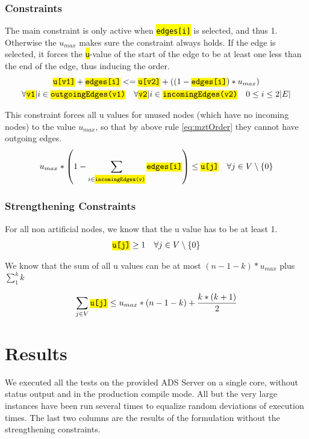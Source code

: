 \documentclass[,%
			paper=a4,%
			DIV14,
			liststotoc,
			bibtotoc,
			draft=false,%
			numbers=noendperiod
			]{scrartcl}
\newcommand{\ilc}[1]{\hl{\texttt{#1}}} %
\newcommand{\vertex}{j}
\newcommand{\edge}{i}
\newcommand{\forallEdges}{\ensuremath{0 \leq \edge \leq 2|E|}}
\begin{document}
\subsubsection{Constraints}
The main constraint is only active when \ilc{edges[\edge]} is selected, and thus 1. Otherwise the $u_{max}$ makes sure the constraint always holds. If the edge is selected, it forces the \ilc{u}-value of the start of the edge to be at least one less than the end of the edge, thus inducing the order.
	\begin{gather}
	\ilc{u[v1]} + \ilc{edges[\edge]} <= \ilc{u[v2]} + ( ( 1 - \ilc{edges[\edge]}) * u_{max} ) \nonumber \\
	\forall \ilc{v1}| \edge \in \ilc{outgoingEdges(v1)}
	\quad
	\forall \ilc{v2} | \edge \in \ilc{incomingEdges(v2)}
	\quad \forallEdges
\label{eq:mztOrder}
\end{gather}

This constraint forces all u values for unused nodes (which have no incoming nodes) to the value $u_{max}$, so that by above rule \eqref{eq:mztOrder} they cannot have outgoing edges.
\begin{equation}\label{eq:mztUnused}
 u_{max}*\left(1 - \sum_{ i \in \ilc{incomingEdges(v)}} \ilc{edges[i]} \right) \leq \ilc{u[\vertex]}
 \quad \forall \vertex \in V  \setminus \{0\}
\end{equation}


\subsubsection{Strengthening Constraints}
For all non artificial nodes, we know that the u value has to be at least 1.
\begin{equation}\label{eq:mztNodes1}
 \ilc{u[\vertex]} \geq 1
 \quad \forall \vertex \in V  \setminus \{0\}
\end{equation}

We know that the sum of all u values can be at most $(n-1 - k) * u_{max}$ plus $\sum_1^k{k}$

\begin{equation}\label{eq:mztMaxU}
	\sum_{\vertex \in V}{\ilc{u[\vertex]}} \leq u_{max} * ( n - 1 - k ) + \frac{k * (k+1)}{2}
\end{equation}


\section{Results}
We executed all the tests on the provided ADS Server on a single core, without status output and in the production compile mode. All but the very large instances have been run several times to equalize random deviations of execution times. The last two columns are the results of the formulation without the strengthening constraints.
\end{document}
